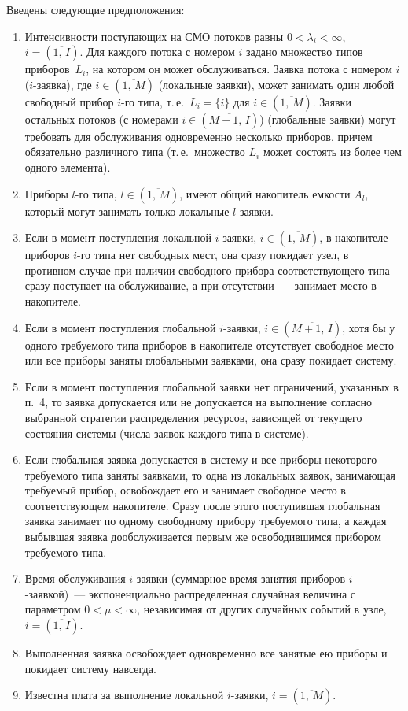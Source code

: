 \begin{multicols}{2}
  Введены следующие предположения:
  \begin{enumerate}[1.]
\item Интенсивности поступающих на СМО потоков равны $0 < \lambda_i < \infty$, 
$i=(\overline{1,\,I})$. Для каждого потока с номером $i$ задано
множество типов приборов~$L_i$, на котором он может обслуживаться.
Заявка потока с номером $i$ ($i$-заявка), где $i \in (\overline{1,\,M})$
(локальные заявки), может занимать один любой свободный прибор $i$-го
типа, т.\,е.\ $L_i = \{i\}$ для $i\in (\overline{1,\,M})$. Заявки остальных
потоков (с номерами $i\in (\overline{M+1,\,I})$) (глобальные заявки) могут
требовать для обслуживания одновременно несколько приборов, причем
обязательно различного типа (т.\,е.\ множество $L_i$ может состоять из
более чем одного элемента).
\item Приборы $l$-го типа, $l\in (\overline{1,\,M})$, имеют общий накопитель
емкости $A_l$, который могут занимать только локальные $l$-заявки.
\item Если в момент поступления локальной $i$-заявки, $i\in
(\overline{1,\,M})$, в накопителе приборов $i$-го типа нет свободных мест,
она сразу покидает узел, в противном случае при наличии свободного
прибора соответствующего типа сразу поступает на обслуживание, а при
отсутствии~--- занимает место в накопителе.
\item Если в момент поступления глобальной $i$-за\-яв\-ки, $i\in
(\overline{M+1,\,I})$, хотя бы у одного требуемого типа приборов в
накопителе отсутствует свободное место или все приборы заняты
глобальными заявками, она сразу покидает систему.
\item Если в момент поступления глобальной за\-явки нет ограничений,
указанных в п.~4, то заявка допускается или не допускается на выполнение
согласно выбранной стратегии распределения ресур\-сов, зависящей от
текущего состояния системы (числа заявок каждого типа в системе).
\item Если глобальная заявка допускается в систему и все приборы
некоторого требуемого типа заняты заявками, то одна из локальных заявок,
занимающая требуемый прибор, освобождает его и занимает свободное
место в соответствующем накопителе. Сразу после этого поступившая
глобальная заявка занимает по одному свободному прибору требуемого типа,
а каждая выбывшая заявка дообслуживается первым же освободившимся
прибором требуемого типа.
\item Время обслуживания $i$-заявки (суммарное время занятия приборов
$i$-заявкой)~--- экспоненциально распределенная случайная величина с
параметром $0 < \mu < \infty$, независимая от других случайных событий в
узле, $i = (\overline{1,\,I})$.
\item Выполненная заявка освобождает одновременно все занятые ею
приборы и покидает систему навсегда.
\item Известна плата за выполнение локальной $i$-за\-яв\-ки, $i= (\overline{1,\,M})$.
\end{enumerate}


\end{multicols}
